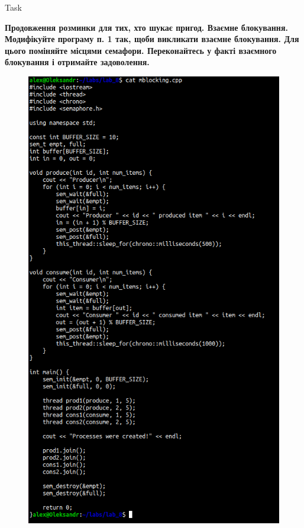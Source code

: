 \documentclass[a4paper,12pt]{article}
\newcommand{\RomanNumeralCaps}[1]{\MakeUppercase{\romannumeral #1}}
\begin{document}
\newpage
    \begin{center}
        \Large{Task \RomanNumeralCaps{3}}
    \end{center}
    \textbf{Продовження розминки для тих, хто шукає пригод. Взаємне блокування. \\
    Модифікуйте програму п. 1 так, щоби викликати взаємне блокування. Для цього поміняйте місцями семафори.
    Переконайтесь у факті взаємного блокування і отримайте задоволення.}
    \begin{figure}[h!]
        \begin{minipage}[h]{1\linewidth}
            \centering
            \includegraphics[width=0.7\linewidth]{Prt sc/Figure_3_1.png}  
        \end{minipage}
    \end{figure}
\end{document}
